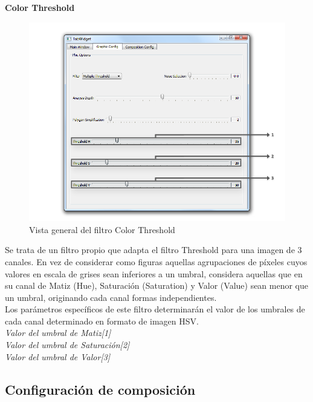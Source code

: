 	\noindent\textbf{Color Threshold}\\

		\begin{figure}[htbp]
		\centering
		\hspace*{-0.9in}
		\includegraphics[scale=0.57]{graphics/interfaz3threshold.png}
		\caption{Vista general del filtro Color Threshold}
		\label{fig:interfaz3threshold}
		\end{figure}

		Se trata de un filtro propio que adapta el filtro Threshold para una imagen de 3 canales. En vez de considerar como figuras aquellas agrupaciones de píxeles cuyos valores en escala de grises sean inferiores a un umbral, considera aquellas que en su canal de Matiz (Hue), Saturación (Saturation) y Valor (Value) sean menor que un umbral, originando cada canal formas independientes.\\
		
		Los parámetros específicos de este filtro determinarán el valor de los umbrales de cada canal determinado en formato de imagen HSV.\\		
		
		\noindent\textit{Valor del umbral de Matiz[1]}\\
		\noindent\textit{Valor del umbral de Saturación[2]}\\
		\noindent\textit{Valor del umbral de Valor[3]}




		
		\subsection{Configuración de composición}
		
